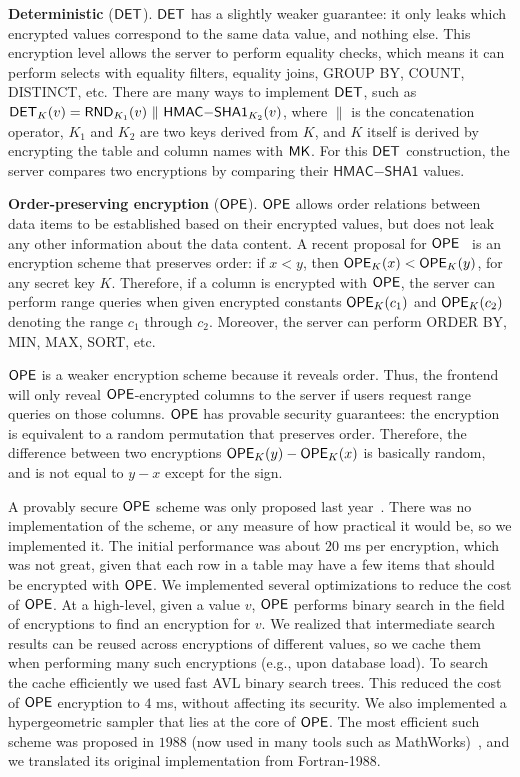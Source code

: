 \textbf{Deterministic} ($\mathsf{DET}$)\@. $\mathsf{DET}$ has a slightly weaker guarantee:
it only leaks which encrypted values correspond to the same data value, and
nothing else. This encryption level allows the server to perform equality
checks, which means it can perform selects with equality filters, equality
joins, GROUP BY, COUNT, DISTINCT, etc.
There are many ways to implement $\mathsf{DET}$, such as
$\mathsf{DET}_K(v)=\mathsf{RND}_{K_1}(v) ~ \| ~ \mathsf{HMAC}\mathrm{-}\mathsf{SHA1}_{K_2}(v)$,
where $\|$ is the concatenation operator, $K_1$ and $K_2$ are two keys derived
from $K$, and $K$ itself is derived by encrypting the table and column names
with $\mathsf{MK}$\@.
For this $\mathsf{DET}$ construction, the server compares two encryptions by
comparing their $\mathsf{HMAC}\mathrm{-}\mathsf{SHA1}$ values.

\textbf{Order-preserving encryption} ($\mathsf{OPE}$)\@. $\mathsf{OPE}$ allows order relations
between data items to be established based on their encrypted values, but does
not leak any other information about the data content. A recent proposal for
$\mathsf{OPE}$~\cite{boldyreva-ope} is an encryption scheme that preserves order:
if $x < y$, then $\mathsf{OPE}_K(x) < \mathsf{OPE}_K(y)$, for any secret key $K$\@.
Therefore, if a column is encrypted with $\mathsf{OPE}$, the
server can perform range queries when given encrypted constants
$\mathsf{OPE}_K(c_1)$ and $\mathsf{OPE}_K(c_2)$ denoting the range $c_1$ through $c_2$.
Moreover, the server can perform ORDER BY, MIN, MAX, SORT, etc.

$\mathsf{OPE}$ is a weaker encryption scheme because it reveals order.  Thus, the
frontend will only reveal $\mathsf{OPE}$-encrypted columns to the server if users
request range queries on those columns. $\mathsf{OPE}$ has provable security
guarantees: the encryption is equivalent to a random permutation that
preserves order.  Therefore, the difference between two encryptions
$\mathsf{OPE}_K(y) - \mathsf{OPE}_K(x)$ is basically random, and is not equal to $y - x$
except for the sign.

A provably secure $\mathsf{OPE}$ scheme was only proposed last
year~\cite{boldyreva-ope}.  There was no implementation of the scheme,
or any measure of how practical it would be, so we implemented it.
The initial performance was about $20$ ms per encryption, which was not great,
given that each row in a table may have a few items that should be encrypted
with $\mathsf{OPE}$\@.  We implemented several optimizations to reduce the cost of $\mathsf{OPE}$\@.
At a high-level, given a value $v$, $\mathsf{OPE}$ performs binary search in the field
of encryptions to find an encryption for $v$.  We realized that intermediate
search results can be reused across encryptions of different values, so we
cache them when performing many such encryptions (e.g., upon database load).
To search the cache efficiently we used fast AVL binary search trees.  This
reduced the cost of $\mathsf{OPE}$ encryption to $4$ ms, without affecting its security.
We also implemented a hypergeometric sampler that lies at the core of $\mathsf{OPE}$\@.
The most efficient such scheme was proposed in $1988$ (now used in many tools
such as MathWorks)~\cite{HGD88}, and we translated its original implementation
from Fortran-1988.


